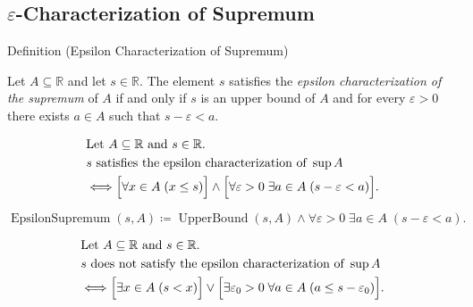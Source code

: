 
\subsection*{\texorpdfstring{$\varepsilon$-Characterization of Supremum}{epsilon-Characterization of Supremum}}





\begin{definitionbox}{Definition (Epsilon Characterization of Supremum)}
\begin{definition}
\label{def:epsilon-characterization-of-supremum}
Let $A\subseteq\mathbb{R}$ and let $s\in\mathbb{R}$. The element $s$ satisfies the \emph{epsilon characterization of the supremum} of $A$ if and only if $s$ is an upper bound of $A$ and for every $\varepsilon>0$ there exists $a\in A$ such that $s-\varepsilon<a$.
\end{definition}
\end{definitionbox}

\begin{remark*}
\[
\begin{aligned}
&\text{Let } A\subseteq\mathbb{R} \text{ and } s\in\mathbb{R}.\\
&s \text{ satisfies the epsilon characterization of } \sup A\\
&\Longleftrightarrow
\Bigl[\forall x\in A\;(x\le s)\Bigr]
\land
\Bigl[\forall \varepsilon>0\;\exists a\in A\;(s-\varepsilon<a)\Bigr].
\end{aligned}
\]
\end{remark*}

\begin{remark*}
\[
\operatorname{EpsilonSupremum}(s,A)\coloneqq
\operatorname{UpperBound}(s,A)
\land
\forall \varepsilon>0\;\exists a\in A\;(s-\varepsilon<a).
\]
\end{remark*}

\begin{remark*}
\[
\begin{aligned}
&\text{Let } A\subseteq\mathbb{R} \text{ and } s\in\mathbb{R}.\\
&s \text{ does not satisfy the epsilon characterization of } \sup A\\
&\Longleftrightarrow
\Bigl[\exists x\in A\;(s<x)\Bigr]
\lor
\Bigl[\exists \varepsilon_0>0\;\forall a\in A\;(a\le s-\varepsilon_0)\Bigr].
\end{aligned}
\]
\end{remark*}

